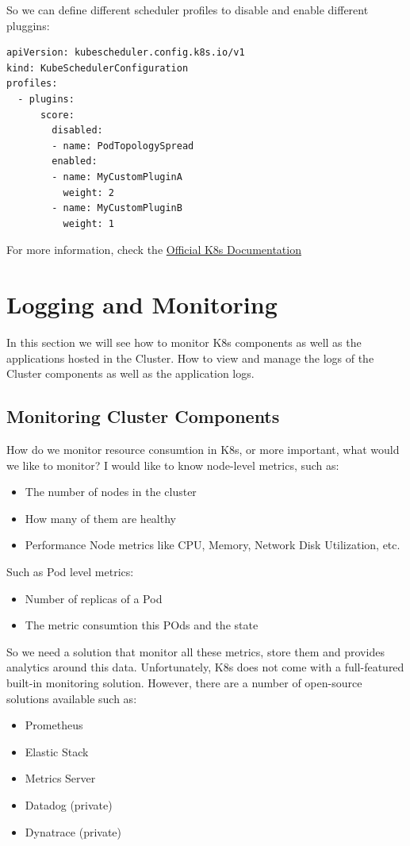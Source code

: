 \documentclass{article}
\newenvironment{codetemplate}[1][]{%
  \mybasecolorbox[#1]
  \itshape
}{%
  \endmybasecolorbox
}
\begin{document}
So we can define different scheduler profiles to disable and enable different pluggins:

\begin{codetemplate}{}
\begin{verbatim}
apiVersion: kubescheduler.config.k8s.io/v1
kind: KubeSchedulerConfiguration
profiles:
  - plugins:
      score:
        disabled:
        - name: PodTopologySpread
        enabled:
        - name: MyCustomPluginA
          weight: 2
        - name: MyCustomPluginB
          weight: 1
\end{verbatim}
\end{codetemplate}

For more information, check the \href{https://kubernetes.io/docs/reference/scheduling/config/}{Official K8s Documentation}


\newpage
\section{Logging and Monitoring}

In this section we will see how to monitor K8s components as well as the applications hosted in the Cluster. How to view and manage the logs of the Cluster components as well as the application logs.

\subsection{Monitoring Cluster Components}

How do we monitor resource consumtion in K8s, or more important, what would we like to monitor? I would like to know node-level metrics, such as:
\begin{itemize}
    \item The number of nodes in the cluster
    \item How many of them are healthy
    \item Performance Node metrics like CPU, Memory, Network Disk Utilization, etc.
\end{itemize}

Such as Pod level metrics:
\begin{itemize}
    \item Number of replicas of a Pod
    \item The metric consumtion this POds and the state
\end{itemize}

So we need a solution that monitor all these metrics, store them and provides analytics around this data. Unfortunately, K8s does not come with a full-featured built-in monitoring solution. However, there are a number of open-source solutions available such as:
\begin{itemize}
    \item Prometheus
    \item Elastic Stack
    \item Metrics Server
    \item Datadog (private)
    \item Dynatrace (private)
\end{itemize}
\end{document}
